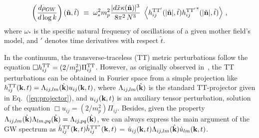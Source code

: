 \documentclass[a4paper,11pt]{article}
\begin{document}
\begin{equation}\label{eq:GWrhoDiscreteSpectrumII}
\left(\frac{d\rho_{GW}}{d\log k}\right)(\tilde{\bf n},\tilde t) ~\equiv~ \omega_*^2m_p^2\frac{|d\tilde x\kappa(\tilde{\bf n})|^3}{8\pi^2\,N^3}\,\,
\left\langle h_{ij}^{{\rm TT}'}(|\tilde{\bf n}|,\tilde t) {h_{ij}^{{\rm TT}'}}^*(|\tilde{\bf n}|,\tilde t)\right\rangle\,,
\end{equation} 
where $\omega_*$ is the specific natural frequency of oscillations of a given mother field's model, and $'$ denotes time derivatives with respect $\tilde t$. 

In the continuum, the transverse-traceless (TT) metric perturbations follow the equation $\Box h_{ij}^{\rm TT} = (2/m_p^2)\Pi_{ij}^{\rm TT}$. However, as originally observed in~\cite{GarciaBellido:2007af}, the TT perturbations can be obtained in Fourier space from a simple projection like $h_{ij}^{\rm TT}({\bf k},t) = \Lambda_{ij,lm}(\hat{\bf k})u_{ij}({\bf k},t)$, where $\Lambda_{ij,lm}(\hat{\bf k})$ is the standard TT-projector given in Eq.~(\ref{eq:projector}), and $u_{ij}({\bf k},t)$ is an auxiliary tensor perturbation, solution of the equation $\Box u_{ij} = (2/m_p^2)\Pi_{ij}$. Besides, given the property $\Lambda_{ij,lm}(\hat{\bf k})\Lambda_{lm,pq}(\hat{\bf k}) = \Lambda_{ij,pq}(\hat{\bf k})$, we can always express the main argument of the GW spectrum as $\dot h_{ij}^{\rm TT}({\bf k},t)\dot h_{ij}^{\rm TT^*}({\bf k},t)$ = $\dot u_{ij}({\bf k},t)\Lambda_{ij,lm}(\hat{\bf k})\dot u_{lm}({\bf k},t)$. 
\end{document}
